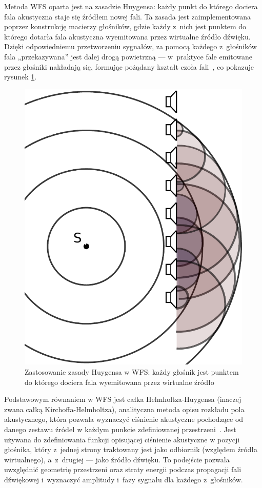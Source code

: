 \documentclass[10pt, a4paper]{article}
\begin{document}
Metoda WFS oparta jest na zasadzie Huygensa: każdy punkt do którego dociera
fala akustyczna staje się źródłem nowej fali. Ta zasada jest zaimplementowana
poprzez konstrukcję macierzy głośników, gdzie każdy z~nich jest punktem do
którego dotarła fala akustyczna wyemitowana przez wirtualne źródło dźwięku.
Dzięki odpowiedniemu przetworzeniu sygnałów, za pomocą każdego z~głośników fala
„przekazywana” jest dalej drogą powietrzną --- w~praktyce fale emitowane przez
głośniki nakładają się, formując pożądany kształt czoła
fali~\cite{hq_rendering}, co pokazuje rysunek
\ref{r:Huygens}.

\begin{figure}[!tbh]
  \centering
  \includegraphics[scale=.4]{vecgraphics/WFS_idea.pdf}
  \caption{Zastosowanie zasady Huygensa w WFS: każdy głośnik jest punktem do
  którego dociera fala wyemitowana przez wirtualne źródło}
  \label{r:Huygens}
\end{figure}

Podstawowym równaniem w WFS jest całka Helmholtza-Huygensa (inaczej zwana całką
Kirchoffa-Helmholtza), analityczna metoda opisu rozkładu pola akustycznego,
która pozwala wyznaczyć ciśnienie akustyczne pochodzące od danego zestawu
źródeł w każdym punkcie zdefiniowanej przestrzeni~\cite{snaka}. Jest używana do
zdefiniowania funkcji opisującej ciśnienie akustyczne w pozycji głośnika, który
z~jednej strony traktowany jest jako odbiornik (względem źródła wirtualnego),
a~z~drugiej --- jako źródło dźwięku. To podejście pozwala uwzględnić geometrię
przestrzeni oraz straty energii podczas propagacji fali dźwiękowej i~wyznaczyć
amplitudy i~fazy sygnału dla każdego z~głośników. 
\end{document}
